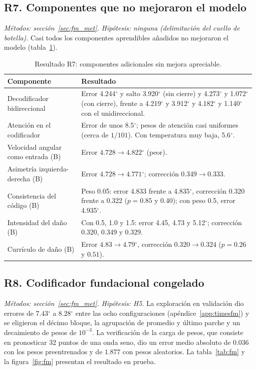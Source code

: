 \documentclass[11pt,a4paper]{article}
\newcommand{\gr}{$^{\circ}$}
\begin{document}
\subsection{R7. Componentes que no mejoraron el modelo}
\label{sec:r7}

\textit{Métodos: sección~\ref{sec:fm_met}. Hipótesis: ninguna (delimitación del cuello de botella).} Casi todos los componentes aprendibles añadidos no mejoraron el modelo (tabla~\ref{tab:neg}).

\begin{table}[h]
\centering\footnotesize
\begin{tabularx}{\textwidth}{@{}>{\raggedright\arraybackslash}p{3.6cm}>{\raggedright\arraybackslash}X@{}}
\toprule
Componente & Resultado \\
\midrule
Decodificador bidireccional & Error 4.244\gr{} y salto 3.920\gr{} (sin cierre) y 4.273\gr{} y 1.072\gr{} (con cierre), frente a 4.219\gr{} y 3.912\gr{} y 4.182\gr{} y 1.140\gr{} con el unidireccional. \\
Atención en el codificador & Error de unos 8.5\gr{}; pesos de atención casi uniformes (cerca de $1/101$). Con temperatura muy baja, 5.6\gr. \\
Velocidad angular como entrada (B) & Error $4.728\to4.822$\gr{} (peor). \\
Asimetría izquierda-derecha (B) & Error $4.728\to4.771$\gr{}; corrección $0.349\to0.333$. \\
Consistencia del código (B) & Peso 0.05: error 4.833 frente a 4.835\gr{}, corrección 0.320 frente a 0.322 ($p=0.85$ y $0.40$); con peso 0.5, error 4.935\gr. \\
Intensidad del daño (B) & Con 0.5, 1.0 y 1.5: error 4.45, 4.73 y 5.12\gr{}; corrección 0.320, 0.349 y 0.329. \\
Currículo de daño (B) & Error $4.83\to4.79$\gr{}, corrección $0.320\to0.324$ ($p=0.26$ y $0.51$). \\
\bottomrule
\end{tabularx}
\caption{Resultado R7: componentes adicionales sin mejora apreciable.}
\label{tab:neg}
\end{table}

\subsection{R8. Codificador fundacional congelado}
\label{sec:r8}

\textit{Métodos: sección~\ref{sec:fm_met}. Hipótesis: H5.} La exploración en validación dio errores de $7.43$\gr{} a $8.28$\gr{} entre las ocho configuraciones (apéndice~\ref{app:timesfm}) y se eligieron el décimo bloque, la agrupación de promedio y último parche y un decaimiento de pesos de $10^{-3}$. La verificación de la carga de pesos, que consiste en pronosticar 32 puntos de una onda seno, dio un error medio absoluto de $0.036$ con los pesos preentrenados y de $1.877$ con pesos aleatorios. La tabla~\ref{tab:fm} y la figura~\ref{fig:fm} presentan el resultado en prueba.
\end{document}
